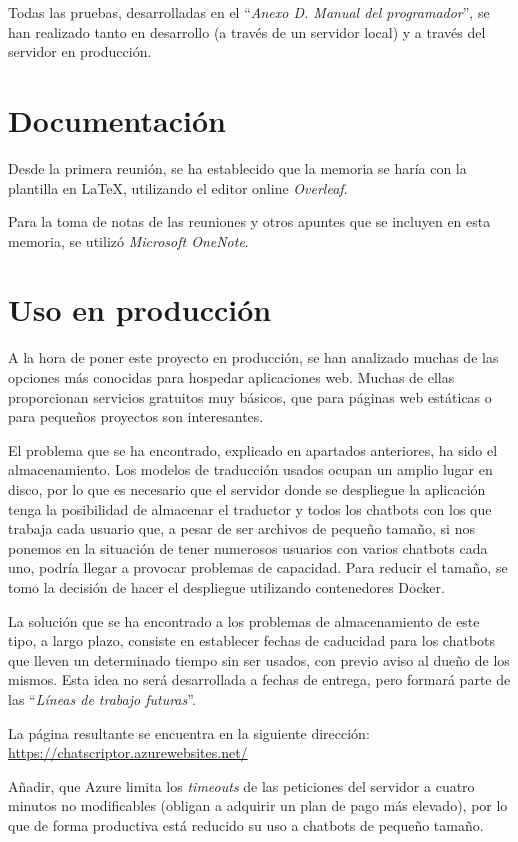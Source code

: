 Todas las pruebas, desarrolladas en el ``\textit{Anexo D. Manual del programador}'', se han realizado tanto en desarrollo (a través de un servidor local) y a través del servidor en producción.

\section{Documentación}
Desde la primera reunión, se ha establecido que la memoria se haría con la plantilla en \LaTeX, utilizando el editor online \textit{Overleaf}. 

Para la toma de notas de las reuniones y otros apuntes que se incluyen en esta memoria, se utilizó \textit{Microsoft OneNote}. 


\section{Uso en producción}
A la hora de poner este proyecto en producción, se han analizado muchas de las opciones más conocidas para hospedar aplicaciones web. Muchas de ellas proporcionan servicios gratuitos muy básicos, que para páginas web estáticas o para pequeños proyectos son interesantes.

El problema que se ha encontrado, explicado en apartados anteriores, ha sido el almacenamiento. Los modelos de traducción usados ocupan un amplio lugar en disco, por lo que es necesario que el servidor donde se despliegue la aplicación tenga la posibilidad de almacenar el traductor y todos los chatbots con los que trabaja cada usuario que, a pesar de ser archivos de pequeño tamaño, si nos ponemos en la situación de tener numerosos usuarios con varios chatbots cada uno, podría llegar a provocar problemas de capacidad. Para reducir el tamaño, se tomo la decisión de hacer el despliegue utilizando contenedores Docker.

La solución que se ha encontrado a los problemas de almacenamiento de este tipo, a largo plazo, consiste en establecer fechas de caducidad para los chatbots que lleven un determinado tiempo sin ser usados, con previo aviso al dueño de los mismos. Esta idea no será desarrollada a fechas de entrega, pero formará parte de las ``\textit{Líneas de trabajo futuras}''.

La página resultante se encuentra en la siguiente dirección: \url{https://chatscriptor.azurewebsites.net/}

Añadir, que Azure limita los \textit{timeouts} de las peticiones del servidor a cuatro minutos no modificables \cite{Applicat61:online} (obligan a adquirir un plan de pago más elevado), por lo que de forma productiva está reducido su uso a chatbots de pequeño tamaño.